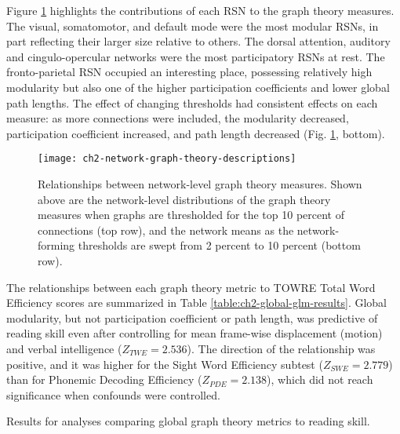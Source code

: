 Figure \ref{fig:ch2-network-graph-theory-descriptions} highlights the contributions of each RSN to the graph theory measures. The visual, somatomotor, and default mode were the most modular RSNs, in part reflecting their larger size relative to others. The dorsal attention, auditory and cingulo-opercular networks were the most participatory RSNs at rest. The fronto-parietal RSN occupied an interesting place, possessing relatively high modularity but also one of the higher participation coefficients and lower global path lengths. The effect of changing thresholds had consistent effects on each measure: as more connections were included, the modularity decreased, participation coefficient increased, and path length decreased (Fig. \ref{fig:ch2-network-graph-theory-descriptions}, bottom). 

\begin{figure}[t]
    \centering
    \texttt{[image: ch2-network-graph-theory-descriptions]}
    \caption[Relationships between network-level graph theory measures]{Relationships between network-level graph theory measures. Shown above are the network-level distributions of the graph theory measures when graphs are thresholded for the top 10 percent of connections (top row), and the network means as the network-forming thresholds are swept from 2 percent to 10 percent (bottom row).}
    \label{fig:ch2-network-graph-theory-descriptions}
\end{figure}

The relationships between each graph theory metric to TOWRE Total Word Efficiency scores are summarized in Table \ref{table:ch2-global-glm-results}. Global modularity, but not participation coefficient or path length, was predictive of reading skill even after controlling for mean frame-wise displacement (motion) and verbal intelligence ($Z_{TWE} = 2.536$). The direction of the relationship was positive, and it was higher for the Sight Word Efficiency subtest ($Z_{SWE} = 2.779$) than for Phonemic Decoding Efficiency ($Z_{PDE} = 2.138$), which did not reach significance when confounds were controlled. 

\begin{table}[t]
    \renewcommand{\tabcolsep}{0.09cm}
    \centering
    
    \caption[Comparison of global graph theory metrics to reading skill]{Results for analyses comparing global graph theory metrics to reading skill.}
    \label{table:ch2-global-glm-results}
\end{table}

